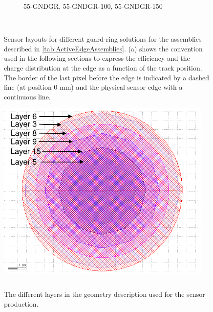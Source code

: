 \begin{figure}[htbp]
\begin{subfigure}[t]{0.5\textwidth}
\begin{tikzpicture}
    \end{tikzpicture}
    \caption{55-GNDGR, 55-GNDGR-100, 55-GNDGR-150}
    \label{fig:Layout50_GNDGR}
  \end{subfigure}~
  \caption{Sensor layouts for different guard-ring solutions for the
    assemblies described in \cref{tab:ActiveEdgeAssemblies}. (a) shows
    the convention used in the following sections to express the
    efficiency and the charge distribution at the edge as a function
    of the track position. The border of the last pixel before the
    edge is indicated by a dashed line (at position 0 mm) and the
    physical sensor edge with a continuous line.}
  \label{fig:Layout_guard_ring}
\end{figure}


\begin{figure}[htbp]
  \centering
  \begin{minipage}[t]{.4\textwidth}
    \centering
    \vspace{0pt}
    \includegraphics[width=0.95\textwidth]{figures/ActiveEdge/pixelLayout_withLayers.png}
    \caption{The different layers in the geometry description used for
      the sensor production.}
    \label{fig:PixelLayout}
  \end{minipage}
  \hfill
  \begin{minipage}[t]{.56\textwidth}
    \centering
    \vspace{0pt}
    \label{tab:PixelStackDimensions}
    \begin{tabular}{l l}

\end{tabular}
\end{minipage}
\end{figure}
